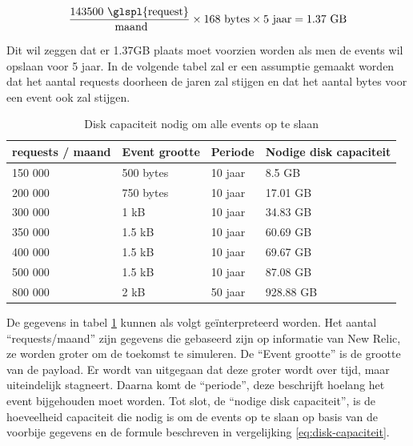 \begin{equation} \label{eq:disk-capaciteit}
\frac{143 500 \text{ \glspl{request}}}{\text{ maand}} \times 168 \text{ bytes} \times 5 \text{ jaar} = 1.37 \text{ GB} 
\end{equation}

Dit wil zeggen dat er 1.37GB plaats moet voorzien worden als men de events wil opslaan voor 5 jaar. In de volgende tabel zal er een assumptie gemaakt worden dat het aantal \glspl{request} doorheen de jaren zal stijgen en dat het aantal bytes voor een event ook zal stijgen.

\begin{table}[h]
\centering
\caption[Disk capaciteit nodig om alle events op te slaan]{Disk capaciteit nodig om alle events op te slaan\footnotemark}
\begin{tabular}{@{}llll@{}}
\toprule
\Glspl{request} / maand & Event grootte & Periode & Nodige disk capaciteit \\ \midrule
150 000 & 500 bytes & 10 jaar & 8.5 GB \\
200 000 & 750 bytes & 10 jaar & 17.01 GB \\
300 000 & 1 kB & 10 jaar & 34.83 GB \\
350 000 & 1.5 kB & 10 jaar & 60.69 GB \\
400 000 & 1.5 kB & 10 jaar & 69.67 GB \\
500 000 & 1.5 kB & 10 jaar & 87.08 GB \\ \midrule
800 000 & 2 kB & 50 jaar & 928.88 GB \\ \bottomrule
\end{tabular}
\label{disk-capaciteit}
\end{table}


De gegevens in tabel \ref{disk-capaciteit} kunnen als volgt geïnterpreteerd worden. Het aantal ``\glspl{request}/maand'' zijn gegevens die gebaseerd zijn op informatie van New Relic, ze worden groter om de toekomst te simuleren. De ``Event grootte'' is de grootte van de \gls{payload}. Er wordt van uitgegaan dat deze groter wordt over tijd, maar uiteindelijk stagneert. Daarna komt de ``periode'', deze beschrijft hoelang het event bijgehouden moet worden. Tot slot, de ``nodige disk capaciteit'', is de hoeveelheid capaciteit die nodig is om de events op te slaan op basis van de voorbije gegevens en de formule beschreven in vergelijking \ref{eq:disk-capaciteit}.

